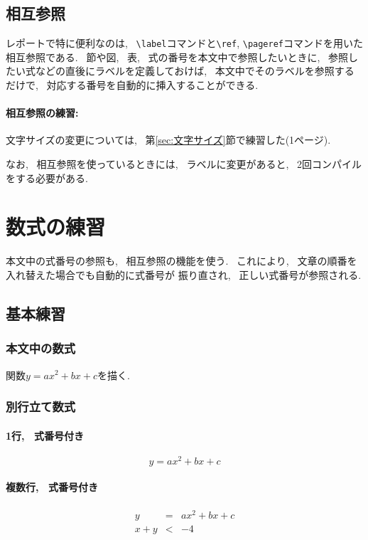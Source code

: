 \documentclass[titlepage]{jarticle}
\begin{document}
	\subsection{相互参照}
		レポートで特に便利なのは, ~\verb|\label|コマンドと\verb|\ref|,
		\verb|\pageref|コマンドを用いた相互参照である. ~節や図, ~表, ~式の番号を本文中で参照したいときに,
		~参照したい式などの直後にラベルを定義しておけば, ~本文中でそのラベルを参照するだけで,
		~対応する番号を自動的に挿入することができる.

	\paragraph{相互参照の練習:}
	文字サイズの変更については, ~第\ref{sec:文字サイズ}節で練習した(1ページ).

	なお, ~相互参照を使っているときには, ~ラベルに変更があると, ~2回コンパイルをする必要がある.


\section{数式の練習}
	本文中の式番号の参照も, ~相互参照の機能を使う. ~これにより, ~文章の順番を入れ替えた場合でも自動的に式番号が
	振り直され, ~正しい式番号が参照される.

	\subsection{基本練習}
		\subsubsection{本文中の数式}
			関数$y = ax^2 + bx + c$を描く.

		\subsubsection{別行立て数式}
			\paragraph{1行, ~式番号付き}
			\begin{equation}
				y = ax^2 + bx + c
			\end{equation}

			\paragraph{複数行, ~式番号付き}
			\begin{eqnarray}
				y &=& ax^2 + bx + c \\
				x + y &<& -4 \nonumber
			\end{eqnarray}
\end{document}
